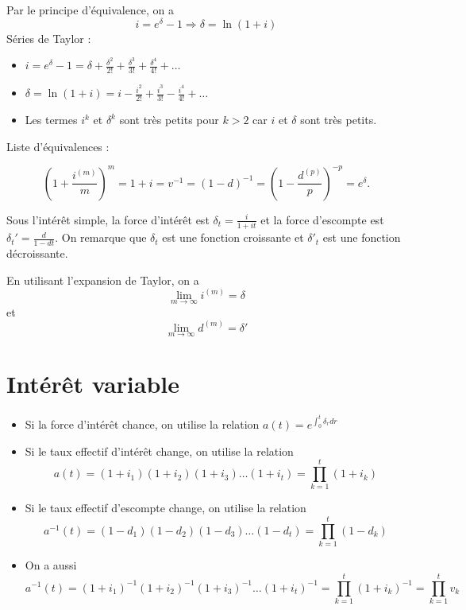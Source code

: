 Par le principe d'équivalence, on a 
$$i = e^\delta - 1 \Rightarrow \delta = \ln (1 + i)$$
Séries de Taylor : 
\begin{itemize}
	\item $\displaystyle i = e^\delta - 1 = \delta + \frac{\delta^2}{2!} + \frac{\delta^3}{3!} + \frac{\delta^4}{4!} + \dots$
	\item $\displaystyle \delta = \ln (1 + i) = i - \frac{i^2}{2!} + \frac{i^3}{3!} - \frac{i^4}{4!} + \dots$
	\item Les termes $i^k$ et $\delta^k$ sont très petits pour $k>2$ car $i$ et $\delta$ sont très petits.
\end{itemize}

Liste d'équivalences : 

$$\left(1 + \frac{i^{(m)}}{m}\right)^m = 1 + i = v^{-1} = (1-d)^{-1} = \left(1 - \frac{d^{(p)}}{p}\right)^{-p} = e^\delta.$$

Sous l'intérêt simple, la force d'intérêt est $\delta_t = \frac{i}{1 + it}$ et la force d'escompte est $\delta_t' = \frac{d}{1 - dt}$. On remarque que $\delta_t$ est une fonction croissante et $\delta'_t$ est une fonction décroissante. 

En utilisant l'expansion de Taylor, on a 
$$\lim\limits_{m\to\infty} i^{(m)} = \delta$$
et
$$\lim\limits_{m\to\infty} d^{(m)} = \delta'$$

\section{Intérêt variable}

\begin{itemize}
	\item Si la force d'intérêt chance, on utilise la relation $a(t) = e^{\int_{0}^{t}\delta_r dr}$
	\item Si le taux effectif d'intérêt change, on utilise la relation $$a(t) = (1 + i_1)(1 + i_2)(1 + i_3) \dots (1 + i_t) = \prod_{k = 1}^{t}(1 + i_k)$$
	\item Si le taux effectif d'escompte change, on utilise la relation
	$$a^{-1}(t) = (1 - d_1)(1 - d_2)(1 - d_3) \dots (1 - d_t) = \prod_{k = 1}^{t}(1 - d_k)$$
	\item On a aussi
	$$a^{-1}(t) = (1 + i_1)^{-1}(1 + i_2)^{-1}(1 + i_3)^{-1} \dots (1 + i_t)^{-1} = \prod_{k = 1}^{t}(1 + i_k)^{-1} = \prod_{k = 1}^{t}v_k$$
\end{itemize}
